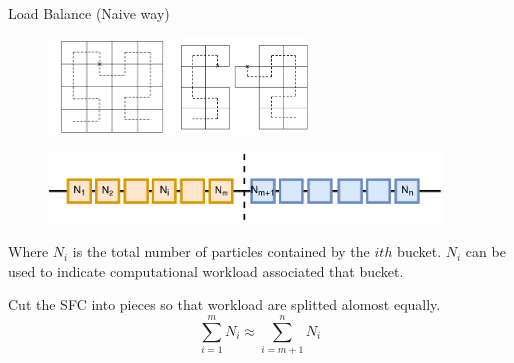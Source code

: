 \documentclass{beamer}
\begin{document}
\begin{frame}{Load Balance (Naive way)}
\begin{figure}
\flushleft
\includegraphics[width=0.3\textwidth]{./PPT/SFC_bucket_decomposition}
\hfill
\includegraphics[width=0.305\textwidth]{./PPT/SFC_bucket_decomposition_Partition}
\end{figure}

\begin{figure}
\flushleft
\includegraphics[width=0.93\textwidth]{./PPT/Domain-Decomposition}
\end{figure}

Where $N_i$ is the total number of particles contained by the $ith$ bucket. $N_i$ can be used to indicate computational workload associated that bucket. 

Cut the SFC into pieces so that workload are splitted alomost equally.
\begin{equation}
\sum_{i=1}^{m} N_i \approx \sum_{i=m+1}^{n} N_i
\end{equation}
\end{frame}
\end{document}
